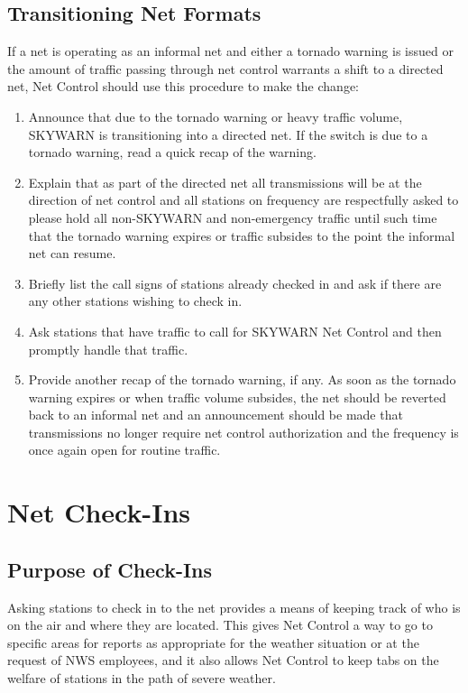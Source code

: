 \documentclass[pdflatex,letterpaper,twoside,12pt]{book}
\begin{document}
\subsection{Transitioning Net Formats}

If a net is operating as an informal net and either a tornado warning is issued or the amount of traffic passing through net control warrants a shift to a directed net, Net Control should use this procedure to make the change:

\begin{enumerate}
\item Announce that due to the tornado warning or heavy traffic volume, SKYWARN is transitioning into a directed net. If the switch is due to a tornado warning, read a quick recap of the warning.
\item Explain that as part of the directed net all transmissions will be at the direction of net control and all stations on frequency are respectfully asked to please hold all non-SKYWARN and non-emergency traffic until such time that the tornado warning expires or traffic subsides to the point the informal net can resume.
\item Briefly list the call signs of stations already checked in and ask if there are any other stations wishing to check in.
\item Ask stations that have traffic to call for SKYWARN Net Control and then promptly handle that traffic.
\item Provide another recap of the tornado warning, if any.
As soon as the tornado warning expires or when traffic volume subsides, the net should be reverted back to an informal net and an announcement should be made that transmissions no longer require net control authorization and the frequency is once again open for routine traffic.
\end{enumerate}


\section{Net Check-Ins}

\subsection{Purpose of Check-Ins}

Asking stations to check in to the net provides a means of keeping track of who is on the air and where they are located.  This gives Net Control a way to go to specific areas for reports as appropriate for the weather situation or at the request of NWS employees, and it also allows Net Control to keep tabs on the welfare of stations in the path of severe weather.
\end{document}
